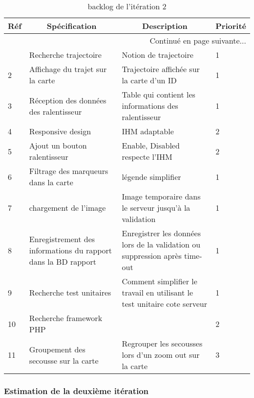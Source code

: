 \begin{center}
    \footnotesize
    \begin{longtable}{| p{1cm} | p{5cm} | p{7cm} | p{1cm} |}
        \caption{backlog de l'itération 2}
        \label{tab:sprint2-backlog} \\

        \hline
        \multicolumn{1}{|c}{\textbf{Réf}} &
        \multicolumn{1}{|c}{\textbf{Spécification}} &
        \multicolumn{1}{|c}{\textbf{Description}} &
        \multicolumn{1}{|c|}{\textbf{Priorité}} \\ \hline
        \endhead

        \hline \multicolumn{4}{|r|}{{Continué en page suivante$\dotsc$}} \\ \hline
        \endfoot

        \hline \hline
        \endlastfoot

        \hline
1 & Recherche trajectoire & Notion de trajectoire & 1 \\ \hline
2 & Affichage du trajet sur la carte & Trajectoire affichée sur la carte d'un ID & 1 \\ \hline
3 & Réception des données des ralentisseur &Table qui contient les informations des ralentisseur & 1 \\ \hline
4 & Responsive design & IHM adaptable & 2 \\ \hline
5 & Ajout un bouton ralentisseur & Enable, Disabled respecte l'IHM & 2 \\ \hline
6 & Filtrage des marqueurs dans la carte & légende simplifier & 1 \\ \hline
7 & chargement de l'image & Image temporaire dans le serveur jusqu'à la validation & 1 \\ \hline
8 & Enregistrement des informations du rapport dans la BD rapport & Enregistrer les données lors de la validation ou suppression après time-out & 1 \\ \hline
9 & Recherche test unitaires & Comment simplifier le travail en utilisant le test unitaire cote serveur & 1 \\ \hline
10 & Recherche framework PHP & & 2 \\ \hline
11 & Groupement des secousse sur la carte & Regrouper les secousses lors d'un zoom out sur la carte & 3 \\ \hline
    \end{longtable}
\end{center}

\subsubsection{Estimation de la deuxième itération}

